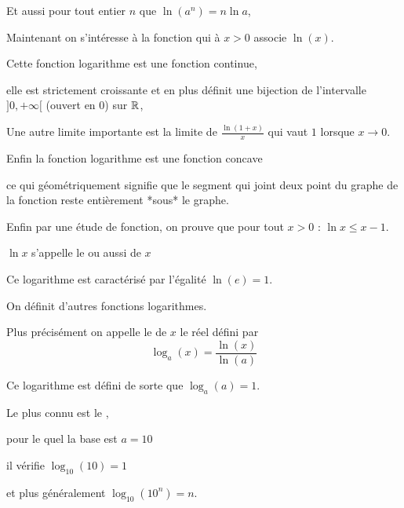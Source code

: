 \change

Et aussi pour tout entier $n$ que
$\ln(a^n) = n \ln a$,


\change

Maintenant on s'intéresse à la fonction qui à $x>0$ associe $\ln(x)$.

Cette fonction logarithme est une fonction continue, 

elle est strictement croissante et en plus définit une bijection de
l'intervalle $]0,+\infty[$ (ouvert en $0$) sur $\mathbb{R}$,


\change

Une autre limite importante est la limite 
 de $\frac{\ln(1+x)}{x}$ qui vaut  $1$ lorsque $x\to0$.
 
 
\change

Enfin la fonction logarithme est une fonction concave 

ce qui géométriquement signifie que le segment qui joint deux point du graphe de la fonction reste entièrement *sous* le graphe.

Enfin par une étude de fonction, on prouve que pour tout $x>0$ :
 $\ln x \le x-1$.






\diapo

$\ln x$ s'appelle le  ou aussi  de $x$

\change

Ce logarithme est caractérisé par l'égalité $\ln(e)=1$.

\change

On définit d'autres fonctions logarithmes.

Plus précisément on appelle le  de $x$
le réel défini par 
$$\log_a(x) = \frac{\ln(x)}{\ln(a)}$$

\change


Ce logarithme est défini de sorte que $\log_a(a)=1$.

\change

Le plus connu est  le ,

pour le quel la base est $a=10$ 

il vérifie $\log_{10} (10)=1$ 

et plus généralement $\log_{10}(10^n)=n$.



